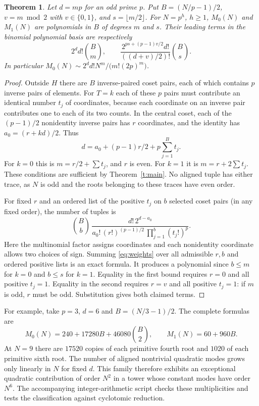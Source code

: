 \documentclass[10pt]{article}
\newtheorem{theorem}{Theorem}
\begin{document}
\begin{theorem}\label{t:count}
Let $d=mp$ for an odd prime $p$. Put $B=(N/p-1)/2$, $v=m\bmod 2$
with $v\in\{0,1\}$, and $s=\lfloor m/2\rfloor$. For $N=p^h$, $h\ge1$,
$M_0(N)$ and $M_1(N)$ are polynomials in $B$ of degrees $m$ and $s$.
Their leading terms in the binomial polynomial basis are respectively
\[
 2^d d!\binom Bm,\qquad
 \frac{2^{ps+(p-1)v/2}d!}{((d+v)/2)!}\binom Bs .
\]
In particular $M_0(N)\sim 2^d d!N^m/\bigl(m!(2p)^m\bigr)$.
\end{theorem}
\begin{proof}
Outside $H$ there are $B$ inverse-paired coset pairs, each of which
contains $p$ inverse pairs of elements. For $T=k$ each of these $p$
pairs must contribute an identical number $t_j$ of coordinates, because
each coordinate on an inverse pair contributes one to each of its two counts. In the
central coset, each of the $(p-1)/2$ nonidentity inverse pairs has
$r$ coordinates, and the identity has $a_0=(r+kd)/2$. Thus
\[
 d=a_0+(p-1)r/2+p\sum_{j=1}^B t_j .
\]
For $k=0$ this is $m=r/2+\sum t_j$, and $r$ is even. For $k=1$
it is $m=r+2\sum t_j$. These conditions are sufficient by
Theorem~\ref{t:main}. No aligned tuple has either trace, as $N$ is odd
and the roots belonging to these traces have even order.

For fixed $r$ and an ordered list of the positive $t_j$ on $b$ selected
coset pairs (in any fixed order), the number of tuples is
\begin{equation}\label{eq:weights}
 \binom Bb\,
 \frac{d!\,2^{d-a_0}}
 {a_0!\,(r!)^{(p-1)/2}\,\prod_{j=1}^{b}(t_j!)^{p}}.
\end{equation}
Here the multinomial factor assigns coordinates and each nonidentity
coordinate allows two choices of sign. Summing \eqref{eq:weights} over all
admissible $r,b$ and ordered positive lists is an exact formula. It
produces a polynomial since $b\le m$ for $k=0$ and $b\le s$ for $k=1$.
Equality in the first bound requires $r=0$ and all positive $t_j=1$.
Equality in the second requires $r=v$ and all positive $t_j=1$:
if $m$ is odd, $r$ must be odd. Substitution gives both claimed terms.
\end{proof}

For example, take $p=3$, $d=6$ and $B=(N/3-1)/2$. The complete formulas are
\[
 M_0(N)=240+17280B+46080\binom B2,\qquad M_1(N)=60+960B .
\]
At $N=9$ there are $17520$ copies of each primitive fourth root and
$1020$ of each primitive sixth root. The number of aligned nontrivial
quadratic modes grows only linearly in $N$ for fixed $d$. This family
therefore exhibits an exceptional quadratic contribution of order $N^2$
in a tower whose constant modes have order $N^6$.
The accompanying integer-arithmetic script checks these multiplicities
and tests the classification against cyclotomic reduction.
\end{document}
